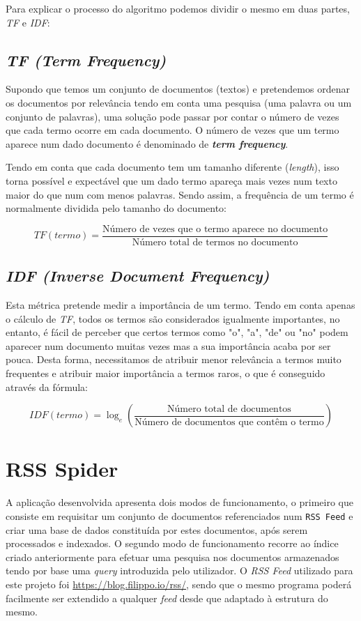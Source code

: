 \documentclass{article}
\begin{document}
Para explicar o processo do algoritmo podemos dividir o mesmo em duas partes, \emph{TF} e \emph{IDF}:

\subsection{\emph{TF (Term Frequency)}}

Supondo que temos um conjunto de documentos (textos) e pretendemos ordenar os documentos por relevância tendo em conta uma pesquisa (uma palavra ou um conjunto de palavras), uma solução pode passar por contar o número de vezes que cada termo ocorre em cada documento. O número de vezes que um termo aparece num dado documento é denominado de \textbf{\emph{term frequency}}.

Tendo em conta que cada documento tem um tamanho diferente (\emph{length}), isso torna possível e expectável que um dado termo apareça mais vezes num texto maior do que num com menos palavras. Sendo assim, a frequência de um termo é normalmente dividida pelo tamanho do documento:

\[
    TF(termo) = \frac{\text{Número de vezes que o termo aparece no documento}}{\text{Número total de termos no documento}}
\]

\subsection{\emph{IDF (Inverse Document Frequency)}}

Esta métrica pretende medir a importância de um termo. Tendo em conta apenas o cálculo de \emph{TF}, todos os termos são considerados igualmente importantes, no entanto, é fácil de perceber que certos termos como "o", "a", "de" ou "no" podem aparecer num documento muitas vezes mas a sua importância acaba por ser pouca. Desta forma, necessitamos de atribuir menor relevância a termos muito frequentes e atribuir maior importância a termos raros, o que é conseguido através da fórmula:

\[
    IDF(termo) = \log_{e} (\frac{\text{Número total de documentos}}{\text{Número de documentos que contêm o termo}})
\]

\section{RSS Spider}
A aplicação desenvolvida apresenta dois modos de funcionamento, o primeiro que consiste em requisitar um conjunto de documentos referenciados num \texttt{RSS Feed}
e criar uma base de dados constituída por estes documentos, após serem processados e indexados. O segundo modo de funcionamento recorre ao índice criado 
anteriormente para efetuar uma pesquisa nos documentos armazenados tendo por base uma \textit{query} introduzida pelo utilizador. 
O \emph{RSS Feed} utilizado para este projeto foi \url{https://blog.filippo.io/rss/}, sendo que o mesmo programa poderá facilmente ser extendido a qualquer \emph{feed} desde que adaptado à estrutura do mesmo.
\end{document}
